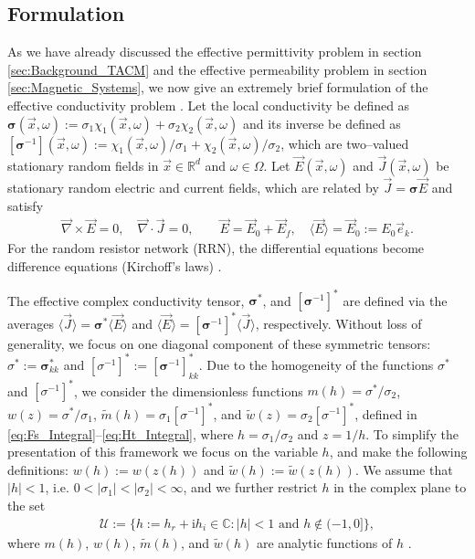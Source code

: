 \documentclass[english,12pt,jmp,graphicx]{revtex4-1}
\newcommand{\I}{\mathrm{i}}
\begin{document}
\subsection{Formulation} \label{sec:Crit_Theory_Formulation} 
%
As we have already discussed the effective permittivity problem in
section \ref{sec:Background_TACM} and the effective permeability
problem in section \ref{sec:Magnetic_Systems}, we now give an extremely
brief formulation of the effective conductivity problem
\cite{Golden:JMP-5627,Golden:CMP-473,Golden:PRL-3935}. Let the local
conductivity be defined
as $\bm{\sigma}(\vec{x},\omega):=\sigma_1\chi_1(\vec{x},\omega)+\sigma_2\chi_2(\vec{x},\omega)$ 
and its inverse be defined as
$[\bm{\sigma}^{-1}](\vec{x},\omega):=\chi_1(\vec{x},\omega)/\sigma_1+\chi_2(\vec{x},\omega)/\sigma_2$,
which are two--valued stationary random fields in
$\vec{x}\in\mathbb{R}^d$ and $\omega\in\Omega$. Let $\vec{E}(\vec{x},\omega)$ and
$\vec{J}(\vec{x},\omega)$ be stationary random electric and current fields,
which are related by $\vec{J}=\bm{\sigma}\vec{E}$ and satisfy 
%
\begin{align}\label{eq:Maxwells_Equations_EJ}  
  	\vec{\nabla}\times\vec{E}=0, \quad
	\vec{\nabla}\cdot\vec{J}=0,\qquad 	
	\vec{E}=\vec{E}_0+\vec{E}_f, \quad
	\langle\vec{E}\rangle=\vec{E}_0:=E_0\vec{e}_k.
\end{align}
%
For the random resistor network (RRN), the differential equations
become difference equations (Kirchoff's laws)
\cite{Golden:CMP-467,Golden:JMP-5627}.

The effective complex conductivity tensor, $\bm{\sigma}^*$, and 
$[\bm{\sigma}^{-1}]^*$ are defined via the averages
$\langle\vec{J}\rangle=\bm{\sigma}^*\langle\vec{E}\rangle$ and $\langle\vec{E}\rangle=[\bm{\sigma}^{-1}]^*\langle\vec{J}\rangle$,
respectively. Without loss of  
generality, we focus on one diagonal component of these
symmetric tensors: $\sigma^*:=\bm{\sigma}^*_{kk}$ and
$[\sigma^{-1}]^*:=[\bm{\sigma}^{-1}]^*_{kk}$. Due to the homogeneity of the
functions $\sigma^*$ and $[\sigma^{-1}]^*$, we consider the dimensionless functions
$m(h)=\sigma^*/\sigma_2$, $w(z)=\sigma^*/\sigma_1$, $\tilde{m}(h)=\sigma_1[\sigma^{-1}]^*$, and
$\tilde{w}(z)=\sigma_2[\sigma^{-1}]^*$, defined in
\eqref{eq:Fs_Integral}--\eqref{eq:Ht_Integral}, where $h=\sigma_1/\sigma_2$ and
$z=1/h$. To simplify the presentation of this framework we focus on
the variable $h$, and make the following definitions: $w(h):=w(z(h))$
and $\tilde{w}(h):=\tilde{w}(z(h))$. We assume that $|h|<1$,
i.e. $0<|\sigma_1|<|\sigma_2|<\infty$, and we further restrict $h$ in the complex
plane to the set  
%
\begin{align}\label{eq:h_Domain}
  \mathcal{U}:=\{h:=h_r+\I h_i\in\mathbb{C}: |h|<1 \text{ and } h\not\in(-1,0]\},
\end{align}
%
where $m(h)$, $w(h)$, $\tilde{m}(h)$, and $\tilde{w}(h)$ are analytic
functions of $h$ \cite{Golden:CMP-473}.  
\end{document}
